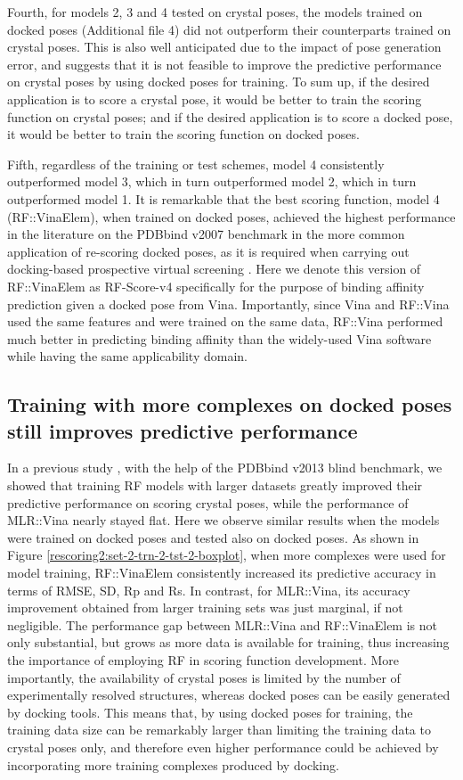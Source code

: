 \documentclass[twocolumn]{bmcart}
\begin{document}
Fourth, for models 2, 3 and 4 tested on crystal poses, the models trained on docked poses (Additional file 4) did not outperform their counterparts trained on crystal poses. This is also well anticipated due to the impact of pose generation error, and suggests that it is not feasible to improve the predictive performance on crystal poses by using docked poses for training. To sum up, if the desired application is to score a crystal pose, it would be better to train the scoring function on crystal poses; and if the desired application is to score a docked pose, it would be better to train the scoring function on docked poses.

Fifth, regardless of the training or test schemes, model 4 consistently outperformed model 3, which in turn outperformed model 2, which in turn outperformed model 1. It is remarkable that the best scoring function, model 4 (RF::VinaElem), when trained on docked poses, achieved the highest performance in the literature on the PDBbind v2007 benchmark in the more common application of re-scoring docked poses, as it is required when carrying out docking-based prospective virtual screening \cite{1362}. Here we denote this version of RF::VinaElem as RF-Score-v4 specifically for the purpose of binding affinity prediction given a docked pose from Vina. Importantly, since Vina and RF::Vina used the same features and were trained on the same data, RF::Vina performed much better in predicting binding affinity than the widely-used Vina software while having the same applicability domain.

\subsection*{Training with more complexes on docked poses still improves predictive performance}

In a previous study \cite{1647}, with the help of the PDBbind v2013 blind benchmark, we showed that training RF models with larger datasets greatly improved their predictive performance on scoring crystal poses, while the performance of MLR::Vina nearly stayed flat. Here we observe similar results when the models were trained on docked poses and tested also on docked poses. As shown in Figure \ref{rescoring2:set-2-trn-2-tst-2-boxplot}, when more complexes were used for model training, RF::VinaElem consistently increased its predictive accuracy in terms of RMSE, SD, Rp and Rs. In contrast, for MLR::Vina, its accuracy improvement obtained from larger training sets was just marginal, if not negligible. The performance gap between MLR::Vina and RF::VinaElem is not only substantial, but grows as more data is available for training, thus increasing the importance of employing RF in scoring function development. More importantly, the availability of crystal poses is limited by the number of experimentally resolved structures, whereas docked poses can be easily generated by docking tools. This means that, by using docked poses for training, the training data size can be remarkably larger than limiting the training data to crystal poses only, and therefore even higher performance could be achieved by incorporating more training complexes produced by docking.
\end{document}
